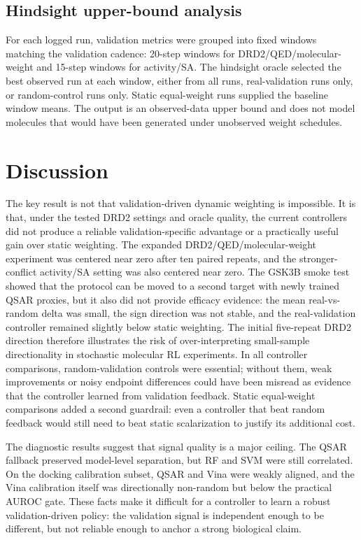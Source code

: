 \documentclass[referee,lineno,pdflatex,sn-basic]{sn-jnl}
\theoremstyle{thmstyleone}%
\theoremstyle{thmstyletwo}%
\theoremstyle{thmstylethree}%
\begin{document}
\subsection{Hindsight upper-bound analysis}\label{subsec:hindsight_methods}

For each logged run, validation metrics were grouped into fixed windows matching the validation cadence: 20-step windows for DRD2/QED/molecular-weight and 15-step windows for activity/SA. The hindsight oracle selected the best observed run at each window, either from all runs, real-validation runs only, or random-control runs only. Static equal-weight runs supplied the baseline window means. The output is an observed-data upper bound and does not model molecules that would have been generated under unobserved weight schedules.

\section{Discussion}\label{sec:discussion}

The key result is not that validation-driven dynamic weighting is impossible. It is that, under the tested DRD2 settings and oracle quality, the current controllers did not produce a reliable validation-specific advantage or a practically useful gain over static weighting. The expanded DRD2/QED/molecular-weight experiment was centered near zero after ten paired repeats, and the stronger-conflict activity/SA setting was also centered near zero. The GSK3B smoke test showed that the protocol can be moved to a second target with newly trained QSAR proxies, but it also did not provide efficacy evidence: the mean real-vs-random delta was small, the sign direction was not stable, and the real-validation controller remained slightly below static weighting. The initial five-repeat DRD2 direction therefore illustrates the risk of over-interpreting small-sample directionality in stochastic molecular RL experiments. In all controller comparisons, random-validation controls were essential; without them, weak improvements or noisy endpoint differences could have been misread as evidence that the controller learned from validation feedback. Static equal-weight comparisons added a second guardrail: even a controller that beat random feedback would still need to beat static scalarization to justify its additional cost.

The diagnostic results suggest that signal quality is a major ceiling. The QSAR fallback preserved model-level separation, but RF and SVM were still correlated. On the docking calibration subset, QSAR and Vina were weakly aligned, and the Vina calibration itself was directionally non-random but below the practical AUROC gate. These facts make it difficult for a controller to learn a robust validation-driven policy: the validation signal is independent enough to be different, but not reliable enough to anchor a strong biological claim.
\end{document}
